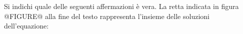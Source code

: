 Si indichi quale delle seguenti affermazioni è vera.
La retta indicata in figura 
@FIGURE@ alla fine del testo
rappresenta l’insieme delle soluzioni dell’equazione: 